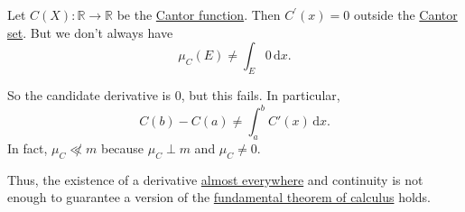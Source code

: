 \begin{eg}
	Let \(C(X) \colon \mathbb{R} \to \mathbb{R}\) be the \hyperref[sssec:Cantor-Function]{Cantor function}. Then \(C^\prime(x) = 0\) outside the \hyperref[eg:lec8:Cantor-set]{Cantor set}.
	But we don't always have
	\[
		\mu_C(E) \neq \int_E 0 \,\mathrm{d} x.
	\]

	So the candidate derivative is \(0\), but this fails. In particular,
	\[
		C(b) - C(a) \neq \int_a^b C'(x) \,\mathrm{d} x.
	\]
	In fact, \(\mu_C \not\ll m\) because \(\mu_C \perp m\) and \(\mu_C \neq 0\).

	Thus, the existence of a derivative \hyperref[def:mu-almost-everywhere]{almost everywhere} and continuity is not enough to guarantee a version of the \underline{fundamental theorem of calculus} holds.
\end{eg}